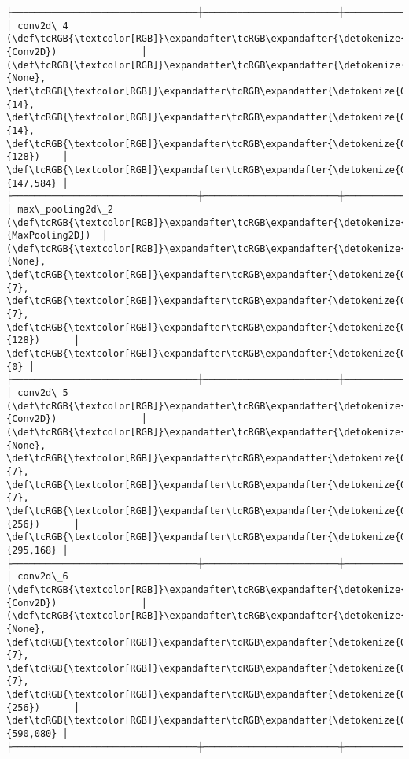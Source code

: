 \documentclass[12pt letter]{report}
\begin{document}
\begin{Verbatim}[commandchars=\\\{\}]
├─────────────────────────────────┼────────────────────────┼───────────────┤
│ conv2d\_4 (\def\tcRGB{\textcolor[RGB]}\expandafter\tcRGB\expandafter{\detokenize{0,135,255}}{Conv2D})               │ (\def\tcRGB{\textcolor[RGB]}\expandafter\tcRGB\expandafter{\detokenize{0,215,255}}{None}, \def\tcRGB{\textcolor[RGB]}\expandafter\tcRGB\expandafter{\detokenize{0,175,0}}{14}, \def\tcRGB{\textcolor[RGB]}\expandafter\tcRGB\expandafter{\detokenize{0,175,0}}{14}, \def\tcRGB{\textcolor[RGB]}\expandafter\tcRGB\expandafter{\detokenize{0,175,0}}{128})    │       \def\tcRGB{\textcolor[RGB]}\expandafter\tcRGB\expandafter{\detokenize{0,175,0}}{147,584} │
├─────────────────────────────────┼────────────────────────┼───────────────┤
│ max\_pooling2d\_2 (\def\tcRGB{\textcolor[RGB]}\expandafter\tcRGB\expandafter{\detokenize{0,135,255}}{MaxPooling2D})  │ (\def\tcRGB{\textcolor[RGB]}\expandafter\tcRGB\expandafter{\detokenize{0,215,255}}{None}, \def\tcRGB{\textcolor[RGB]}\expandafter\tcRGB\expandafter{\detokenize{0,175,0}}{7}, \def\tcRGB{\textcolor[RGB]}\expandafter\tcRGB\expandafter{\detokenize{0,175,0}}{7}, \def\tcRGB{\textcolor[RGB]}\expandafter\tcRGB\expandafter{\detokenize{0,175,0}}{128})      │             \def\tcRGB{\textcolor[RGB]}\expandafter\tcRGB\expandafter{\detokenize{0,175,0}}{0} │
├─────────────────────────────────┼────────────────────────┼───────────────┤
│ conv2d\_5 (\def\tcRGB{\textcolor[RGB]}\expandafter\tcRGB\expandafter{\detokenize{0,135,255}}{Conv2D})               │ (\def\tcRGB{\textcolor[RGB]}\expandafter\tcRGB\expandafter{\detokenize{0,215,255}}{None}, \def\tcRGB{\textcolor[RGB]}\expandafter\tcRGB\expandafter{\detokenize{0,175,0}}{7}, \def\tcRGB{\textcolor[RGB]}\expandafter\tcRGB\expandafter{\detokenize{0,175,0}}{7}, \def\tcRGB{\textcolor[RGB]}\expandafter\tcRGB\expandafter{\detokenize{0,175,0}}{256})      │       \def\tcRGB{\textcolor[RGB]}\expandafter\tcRGB\expandafter{\detokenize{0,175,0}}{295,168} │
├─────────────────────────────────┼────────────────────────┼───────────────┤
│ conv2d\_6 (\def\tcRGB{\textcolor[RGB]}\expandafter\tcRGB\expandafter{\detokenize{0,135,255}}{Conv2D})               │ (\def\tcRGB{\textcolor[RGB]}\expandafter\tcRGB\expandafter{\detokenize{0,215,255}}{None}, \def\tcRGB{\textcolor[RGB]}\expandafter\tcRGB\expandafter{\detokenize{0,175,0}}{7}, \def\tcRGB{\textcolor[RGB]}\expandafter\tcRGB\expandafter{\detokenize{0,175,0}}{7}, \def\tcRGB{\textcolor[RGB]}\expandafter\tcRGB\expandafter{\detokenize{0,175,0}}{256})      │       \def\tcRGB{\textcolor[RGB]}\expandafter\tcRGB\expandafter{\detokenize{0,175,0}}{590,080} │
├─────────────────────────────────┼────────────────────────┼───────────────┤

\end{Verbatim}
\end{document}
